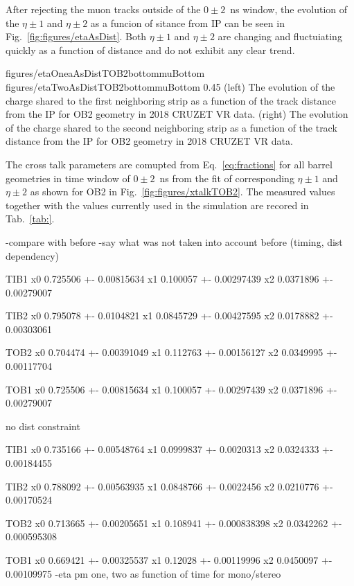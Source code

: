 After rejecting the muon tracks outside of the $0 \pm 2$~ns window, the evolution of the $\eta \pm 1$ and $\eta \pm 2$ as a funcion of sitance from IP can be seen in Fig.~\ref{fig:figures/etaAsDist}. Both $\eta \pm 1$ and $\eta \pm 2$ are changing and fluctuiating quickly as a function of distance and do not exhibit any clear trend. 

                 {figures/etaOneaAsDistTOB2bottommuBottom}
                 {figures/etaTwoAsDistTOB2bottommuBottom} %
                 {0.45}       %
                 {(left) The evolution of the charge shared to the first neighboring strip as a function of the track distance from the IP for OB2 geometry in 2018 CRUZET VR data.  (right) The evolution of the charge shared to the second neighboring strip as a function of the track distance from the IP for OB2 geometry in 2018 CRUZET VR data. }

The cross talk parameters are comupted from Eq.~\ref{eq:fractions} for all barrel geometries in time window of $0 \pm 2$~ns from the fit of corresponding  $\eta \pm 1$ and $\eta \pm 2$ as shown for OB2 in Fig.~\ref{fig:figures/xtalkTOB2}. The measured values together with the values currently used in the simulation are recored in Tab.~\ref{tab:}.

-compare with before
-say what was not taken into account before (timing, dist dependency)

TIB1
x0 0.725506 +- 0.00815634
x1 0.100057 +- 0.00297439
x2 0.0371896 +- 0.00279007

TIB2
x0 0.795078 +- 0.0104821
x1 0.0845729 +- 0.00427595
x2 0.0178882 +- 0.00303061

TOB2
x0 0.704474 +- 0.00391049
x1 0.112763 +- 0.00156127
x2 0.0349995 +- 0.00117704

TOB1
x0 0.725506 +- 0.00815634
x1 0.100057 +- 0.00297439
x2 0.0371896 +- 0.00279007

no dist constraint

TIB1
x0 0.735166 +- 0.00548764
x1 0.0999837 +- 0.0020313
x2 0.0324333 +- 0.00184455

TIB2
x0 0.788092 +- 0.00563935
x1 0.0848766 +- 0.0022456
x2 0.0210776 +- 0.00170524

TOB2
x0 0.713665 +- 0.00205651
x1 0.108941 +- 0.000838398
x2 0.0342262 +- 0.000595308


TOB1
x0 0.669421 +- 0.00325537
x1 0.12028 +- 0.00119996
x2 0.0450097 +- 0.00109975
-eta pm one, two as function of time for mono/stereo %


